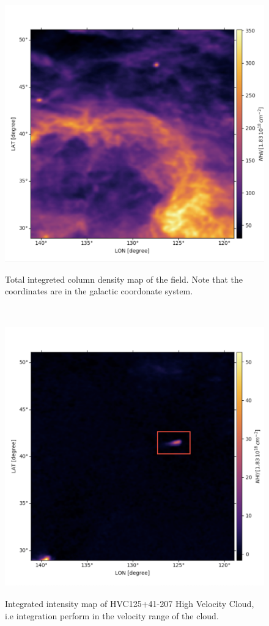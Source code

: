 \documentclass[a4paper,10.5pt]{report}
\begin{document}
\begin{figure}[h!]
  \centering
  \includegraphics[width=4.in]{field.png}
  \label{fig::hyperspectral}
  \caption{Total integreted column density map of the field. Note that the coordinates are in the galactic coordonate system.}
\end{figure} \\

\begin{figure}[h!]
  \centering
  \includegraphics[width=4.in]{hvc_select.png}
  \label{fig::hvc}
  \caption{Integrated intensity map of HVC125+41-207 High Velocity Cloud, i.e integration perform in the velocity range of the cloud.}
\end{figure} \\
\end{document}
